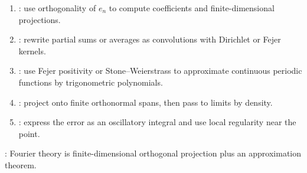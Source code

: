 \begin{method} \label{meth:fourier-structure-proof-patterns} 
\begin{enumerate}[label=(\roman*)]
\setlength{\itemsep}{0pt}
\item {}: use orthogonality of $e_n$ to compute coefficients and finite-dimensional projections.
\item {}: rewrite partial sums or averages as convolutions with Dirichlet or Fejer kernels.
\item {}: use Fejer positivity or Stone--Weierstrass to approximate continuous periodic functions by trigonometric polynomials.
\item {}: project onto finite orthonormal spans, then pass to limits by density.
\item {}: express the error as an oscillatory integral and use local regularity near the point.
\end{enumerate}
: Fourier theory is finite-dimensional orthogonal projection plus an approximation theorem.
\end{method}
